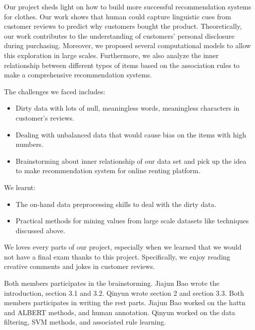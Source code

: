 \documentclass[sigconf]{acmart}
\begin{document}
Our project sheds light on how to build more successful recommendation systems for clothes. Our work shows that human could capture linguistic cues from customer reviews to predict why customers bought the product. Theoretically, our work contributes to the understanding of customers' personal disclosure during purchasing. Moreover, we proposed several computational models to allow this exploration in large scales. Furthermore, we also analyze the inner relationship between different types of items based on the association rules to make a comprehensive recommendation systems.

The challenges we faced includes:
\begin{itemize}
    \item Dirty data with lots of null, meaningless words, meaningless characters in customer's reviews.
    \item Dealing with unbalanced data that would cause bias on the items with high numbers.
    \item Brainstorming about inner relationship of our data set and pick up the idea to make recommendation system for online renting platform.
\end{itemize}
We learnt:
\begin{itemize}
    \item The on-hand data preprocessing skills to deal with the dirty data.
    \item Practical methods for mining values from large scale datasets like techniques discussed above.
  \end{itemize}
We loves every parts of our project, especially when we learned that we would not have a final exam thanks to this project. Specifically, we enjoy reading creative comments and jokes in customer reviews.

Both members participates in the brainstorming. Jiajun Bao wrote the introduction, section 3.1 and 3.2. Qinyun wrote section 2 and section 3.3. Both members participates in writing the rest parts. 
Jiajun Bao worked on the hattn and ALBERT methods, and human annotation. Qinyun worked on the data filtering, SVM methods, and associated rule learning.


\end{document}
